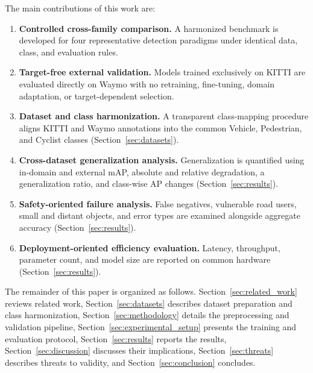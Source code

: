 The main contributions of this work are:

\begin{enumerate}
    \item \textbf{Controlled cross-family comparison.} A harmonized benchmark is
    developed for four representative detection paradigms under identical data,
    class, and evaluation rules.
    \item \textbf{Target-free external validation.} Models trained exclusively on
    KITTI are evaluated directly on Waymo with no retraining, fine-tuning, domain
    adaptation, or target-dependent selection.
    \item \textbf{Dataset and class harmonization.} A transparent class-mapping
    procedure aligns KITTI and Waymo annotations into the common Vehicle, Pedestrian,
    and Cyclist classes (Section~\ref{sec:datasets}).
    \item \textbf{Cross-dataset generalization analysis.} Generalization is quantified
    using in-domain and external mAP, absolute and relative degradation, a
    generalization ratio, and class-wise AP changes
    (Section~\ref{sec:results}).
    \item \textbf{Safety-oriented failure analysis.} False negatives, vulnerable road
    users, small and distant objects, and error types are examined alongside aggregate
    accuracy (Section~\ref{sec:results}).
    \item \textbf{Deployment-oriented efficiency evaluation.} Latency, throughput,
    parameter count, and model size are reported on common hardware
    (Section~\ref{sec:results}).
\end{enumerate}

The remainder of this paper is organized as follows. Section~\ref{sec:related_work}
reviews related work, Section~\ref{sec:datasets} describes dataset preparation and class
harmonization, Section~\ref{sec:methodology} details the preprocessing and validation
pipeline, Section~\ref{sec:experimental_setup} presents the training and evaluation
protocol, Section~\ref{sec:results} reports the results, Section~\ref{sec:discussion}
discusses their implications, Section~\ref{sec:threats} describes threats to validity,
and Section~\ref{sec:conclusion} concludes.
